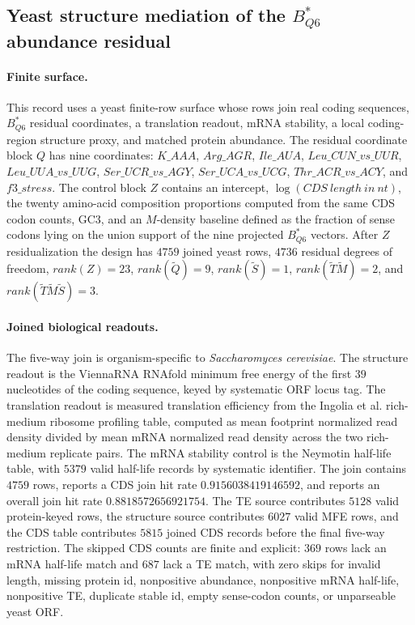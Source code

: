 \subsection{Yeast structure mediation of the $B^*_{Q6}$ abundance residual}\label{sec:bioreality-q6-yeast-structure-mediation}

\paragraph{Finite surface.}
This record uses a yeast finite-row surface whose rows join real coding sequences, $B^*_{Q6}$ residual coordinates, a translation readout, mRNA stability, a local coding-region structure proxy, and matched protein abundance.  The residual coordinate block $Q$ has nine coordinates: $K\_AAA$, $Arg\_AGR$, $Ile\_AUA$, $Leu\_CUN\_vs\_UUR$, $Leu\_UUA\_vs\_UUG$, $Ser\_UCR\_vs\_AGY$, $Ser\_UCA\_vs\_UCG$, $Thr\_ACR\_vs\_ACY$, and $f3\_stress$.  The control block $Z$ contains an intercept, $\log(CDS\ length\ in\ nt)$, the twenty amino-acid composition proportions computed from the same CDS codon counts, GC3, and an $M$-density baseline defined as the fraction of sense codons lying on the union support of the nine projected $B^*_{Q6}$ vectors.  After $Z$ residualization the design has $4759$ joined yeast rows, $4736$ residual degrees of freedom, $rank(Z)=23$, $rank(\widetilde Q)=9$, $rank(\widetilde S)=1$, $rank(\widetilde T\widetilde M)=2$, and $rank(\widetilde T\widetilde M\widetilde S)=3$.

\paragraph{Joined biological readouts.}
The five-way join is organism-specific to \emph{Saccharomyces cerevisiae}.  The structure readout is the ViennaRNA RNAfold minimum free energy of the first $39$ nucleotides of the coding sequence, keyed by systematic ORF locus tag.  The translation readout is measured translation efficiency from the Ingolia et al. rich-medium ribosome profiling table, computed as mean footprint normalized read density divided by mean mRNA normalized read density across the two rich-medium replicate pairs.  The mRNA stability control is the Neymotin half-life table, with $5379$ valid half-life records by systematic identifier.  The join contains $4759$ rows, reports a CDS join hit rate $0.9156038419146592$, and reports an overall join hit rate $0.8818572656921754$.  The TE source contributes $5128$ valid protein-keyed rows, the structure source contributes $6027$ valid MFE rows, and the CDS table contributes $5815$ joined CDS records before the final five-way restriction.  The skipped CDS counts are finite and explicit: $369$ rows lack an mRNA half-life match and $687$ lack a TE match, with zero skips for invalid length, missing protein id, nonpositive abundance, nonpositive mRNA half-life, nonpositive TE, duplicate stable id, empty sense-codon counts, or unparseable yeast ORF.

